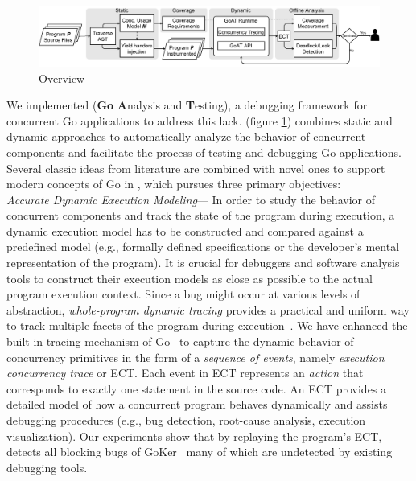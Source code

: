 \begin{figure}[]
\centering
\includegraphics[width=0.99\linewidth]{figs/GOAT_overview.pdf}
\caption{\goat Overview}
\label{fig:goat_workflow}
\end{figure}


We implemented \goat (\textbf{Go} \textbf{A}nalysis and \textbf{T}esting), a debugging framework for concurrent Go applications to address this lack.
%
\goat (figure \ref{fig:goat_workflow}) combines static and dynamic approaches to automatically analyze the behavior of concurrent components and facilitate the process of testing and debugging Go applications.
%
%
Several classic ideas from literature are combined with novel ones to support modern concepts of Go in \goat, which pursues three primary objectives:
\\
 \textit{Accurate Dynamic Execution Modeling}---
In order to study the behavior of concurrent components and track the state of the program during execution, a dynamic execution model has to be constructed and compared against a predefined model (e.g., formally defined specifications or the developer's mental representation of the program).
%
It is crucial for debuggers and software analysis tools to construct their execution models as close as possible to the actual program execution context.
%
Since a bug might occur at various levels of abstraction, \textit{whole-program dynamic tracing} provides a practical and uniform way to track multiple facets of the program during execution~\cite{difftrace}.
%
We have enhanced the built-in tracing mechanism of Go~\cite{ect-arxiv} to capture the dynamic behavior of concurrency primitives in the form of a \textit{sequence of events}, namely \textit{execution concurrency trace} or ECT.
%
Each event in ECT represents an \textit{action} that corresponds to exactly one statement in the source code.
%
An ECT provides a detailed model of how a concurrent program behaves dynamically and assists debugging procedures (e.g., bug detection, root-cause analysis, execution visualization).
%
Our experiments show that by replaying the program's ECT, \goat detects all blocking bugs of GoKer~\cite{yuan-gobench-cgo21} many of which are undetected by existing debugging tools.
